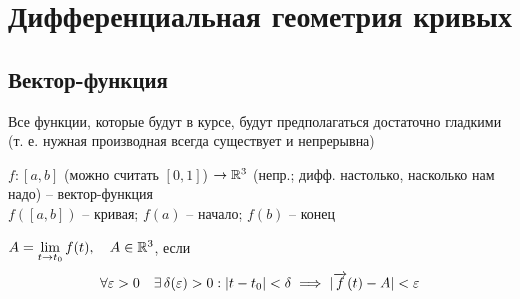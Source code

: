 \chapter{Дифференциальная геометрия кривых}

\section{Вектор-функция}

\begin{remark}
	Все функции, которые будут в курсе, будут предполагаться достаточно гладкими (т. е. нужная производная всегда существует и непрерывна)
\end{remark}

\begin{definition}
	$ f : [a, b] $ (можно считать $ [0, 1] $) $ \to \mathbb{R}^3 $ (непр.; дифф. настолько, насколько нам надо) -- вектор-функция \\
	$ f([a, b]) $ -- кривая; $ f(a) $ -- начало; $ f(b) $ -- конец
\end{definition}

\begin{definition}
	$ A = \lim\limits_{t \to t_0} f(t), \quad A \in \mathbb{R}^3 $, если
	$$ \forall \varepsilon > 0 \quad \exists\, \delta(\varepsilon) > 0 : |t - t_0| < \delta \implies |\overrightarrow{f}(t) - A| < \varepsilon $$
\end{definition}

